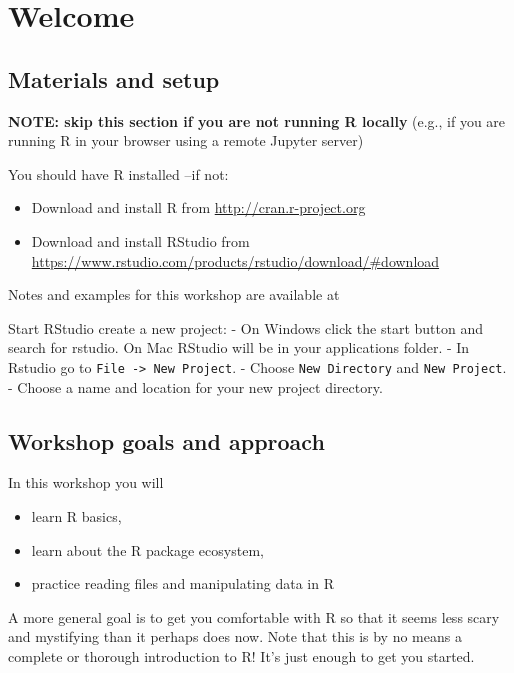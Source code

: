 \documentclass[]{book}
\providecommand{\tightlist}{%
  \setlength{\itemsep}{0pt}\setlength{\parskip}{0pt}}
\begin{document}
\chapter{Welcome}\label{welcome}

\section{Materials and setup}\label{materials-and-setup}

\textbf{NOTE: skip this section if you are not running R locally} (e.g.,
if you are running R in your browser using a remote Jupyter server)

You should have R installed --if not:

\begin{itemize}
\tightlist
\item
  Download and install R from \url{http://cran.r-project.org}
\item
  Download and install RStudio from
  \url{https://www.rstudio.com/products/rstudio/download/\#download}
\end{itemize}

Notes and examples for this workshop are available at
\href{http://tutorials.iq.harvard.edu/R/Rintro/Rintro.html}{}

Start RStudio create a new project: - On Windows click the start button
and search for rstudio. On Mac RStudio will be in your applications
folder. - In Rstudio go to \texttt{File\ -\textgreater{}\ New\ Project}.
- Choose \texttt{New\ Directory} and \texttt{New\ Project}. - Choose a
name and location for your new project directory.

\section{Workshop goals and approach}\label{workshop-goals-and-approach}

In this workshop you will

\begin{itemize}
\tightlist
\item
  learn R basics,
\item
  learn about the R package ecosystem,
\item
  practice reading files and manipulating data in R
\end{itemize}

A more general goal is to get you comfortable with R so that it seems
less scary and mystifying than it perhaps does now. Note that this is by
no means a complete or thorough introduction to R! It's just enough to
get you started.
\end{document}
